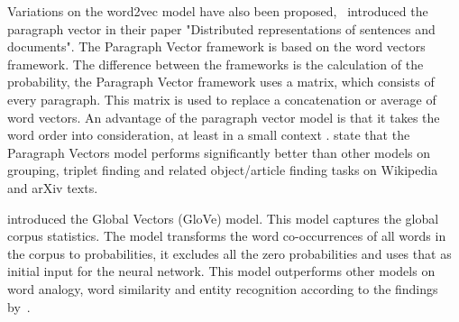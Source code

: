 \documentclass[../../Thesis.tex]{subfiles}
\begin{document}
\begin{jumpin}
Variations on the word2vec model have also been proposed,~\citet{le2014distributed} introduced the paragraph vector in their paper "Distributed representations of sentences and documents". The Paragraph Vector framework is based on the word vectors framework. The difference between the frameworks is the calculation of the probability, the Paragraph Vector framework uses a matrix, which consists of every paragraph. This matrix is used to replace a concatenation or average of word vectors. An advantage of the paragraph vector model is that it takes the word order into consideration, at least in a small context \cite{le2014distributed}. \citet{dai2015document} state that the Paragraph Vectors model performs significantly better than other models on grouping, triplet finding and related object/article finding tasks on Wikipedia and arXiv texts.

\citet{pennington2014glove} introduced the Global Vectors (GloVe) model. This model captures the global corpus statistics. The model transforms the word co-occurrences of all words in the corpus to probabilities, it excludes all the zero probabilities and uses that as initial input for the neural network. This model outperforms other models on word analogy, word similarity and entity recognition according to the findings by~\citet{pennington2014glove}.\\


\end{jumpin}
\end{document}
